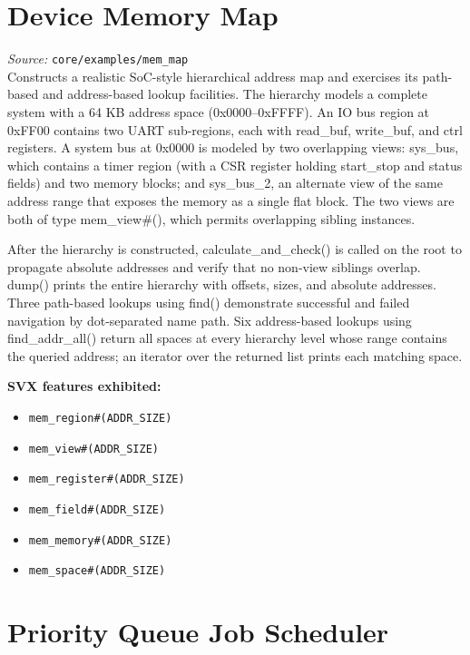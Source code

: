 \documentclass[11pt,letterpaper]{report}
\begin{document}
\section{Device Memory Map}

\textit{Source:} \texttt{core/examples/mem\_map}\\

Constructs a realistic SoC-style hierarchical address map and exercises its path-based and address-based lookup facilities. The hierarchy models a complete system with a 64 KB address space (0x0000--0xFFFF). An IO bus region at 0xFF00 contains two UART sub-regions, each with read\_buf, write\_buf, and ctrl registers. A system bus at 0x0000 is modeled by two overlapping views: sys\_bus, which contains a timer region (with a CSR register holding start\_stop and status fields) and two memory blocks; and sys\_bus\_2, an alternate view of the same address range that exposes the memory as a single flat block. The two views are both of type mem\_view\#(), which permits overlapping sibling instances.

After the hierarchy is constructed, calculate\_and\_check() is called on the root to propagate absolute addresses and verify that no non-view siblings overlap. dump() prints the entire hierarchy with offsets, sizes, and absolute addresses. Three path-based lookups using find() demonstrate successful and failed navigation by dot-separated name path. Six address-based lookups using find\_addr\_all() return all spaces at every hierarchy level whose range contains the queried address; an iterator over the returned list prints each matching space.

\textbf{SVX features exhibited:}

\begin{itemize}
  \item \texttt{mem\_region\#(ADDR\_SIZE)}
  \item \texttt{mem\_view\#(ADDR\_SIZE)}
  \item \texttt{mem\_register\#(ADDR\_SIZE)}
  \item \texttt{mem\_field\#(ADDR\_SIZE)}
  \item \texttt{mem\_memory\#(ADDR\_SIZE)}
  \item \texttt{mem\_space\#(ADDR\_SIZE)}
\end{itemize}
\section{Priority Queue Job Scheduler}
\end{document}

